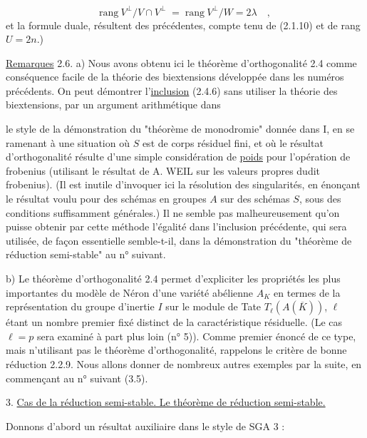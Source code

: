 \begin{equation}\tag{2.5.5}
\mathrm{rang}\ V^{\perp}/V \cap V^{\perp} \;=\; \mathrm{rang}\ V^{\perp}/W = 2\lambda \quad ,
\end{equation}
et la formule duale, résultent des précédentes, compte tenu de (2.1.10) et de rang $U = 2n$.)

\underline{Remarques} 2.6.  a) Nous avons obtenu ici le théorème d'orthogonalité 2.4 comme conséquence facile de la théorie des biextensions développée dans les numéros précédents. On peut démontrer l'\underline{inclusion} (2.4.6) sans utiliser la théorie des biextensions, par un argument arithmétique dans



le style de la démonstration du "théorème de monodromie" donnée dans I, en se ramenant à une situation où $S$ est de corps résiduel fini, et où le résultat d'orthogonalité résulte d'une simple considération de \underline{poids} pour l'opération de frobenius (utilisant le résultat de A. WEIL sur les valeurs propres dudit frobenius). (Il est inutile d'invoquer ici la résolution des singularités, en énonçant le résultat voulu pour des schémas en groupes $A$ sur des schémas $S$, sous des conditions suffisamment générales.) Il ne semble pas malheureusement qu'on puisse obtenir par cette méthode l'égalité dans l'inclusion précédente, qui sera utilisée, de façon essentielle semble-t-il, dans la démonstration du "théorème de réduction semi-stable" au n° suivant.

b) Le théorème d'orthogonalité 2.4 permet d'expliciter les propriétés les plus importantes du modèle de Néron d'une variété abélienne $A_{K}$ en termes de la représentation du groupe d'inertie $I$ sur le module de Tate $T_{\ell}(A(\overline{K}))$, $\ell$ étant un nombre premier fixé distinct de la caractéristique résiduelle. (Le cas $\ell = p$ sera examiné à part plus loin (n° 5)). Comme premier énoncé de ce type, mais n'utilisant pas le théorème d'orthogonalité, rappelons le critère de bonne réduction 2.2.9. Nous allons donner de nombreux autres exemples par la suite, en commençant au n° suivant (3.5).




3. \underline{Cas de la réduction semi-stable. Le théorème de réduction semi-stable.}

Donnons d'abord un résultat auxiliaire dans le style de SGA 3 :

